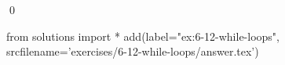 
\begin{ex}
  \label{ex:6-12-while-loops}
  
  \qed
\end{ex}
\begin{python0}
from solutions import *
add(label="ex:6-12-while-loops",
    srcfilename='exercises/6-12-while-loops/answer.tex')
\end{python0}
